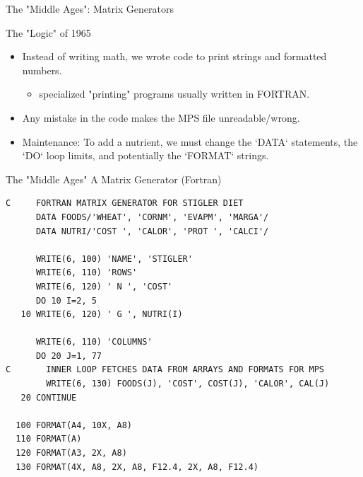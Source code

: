 \documentclass[presentation, aspectratio=169]{beamer}
\begin{document}
\begin{frame}[label={sec:orgff246a0}]{The "Middle Ages": Matrix Generators}
\begin{block}{The "Logic" of 1965}
\begin{itemize}
\item Instead of writing math, we wrote code to print strings and formatted numbers.
\begin{itemize}
\item specialized "printing" programs usually written in FORTRAN.
\end{itemize}
\item Any mistake in the code makes the MPS file unreadable/wrong.
\item \alert{\alert{Maintenance}}: To add a nutrient, we must change the `DATA` statements, the `DO` loop limits, and potentially the `FORMAT` strings.
\end{itemize}
\end{block}
\end{frame}


\begin{frame}[label={sec:org6368686},fragile]{The "Middle Ages"}
 A Matrix Generator (Fortran)

{\scriptsize
\begin{verbatim}
C     FORTRAN MATRIX GENERATOR FOR STIGLER DIET
      DATA FOODS/'WHEAT', 'CORNM', 'EVAPM', 'MARGA'/
      DATA NUTRI/'COST ', 'CALOR', 'PROT ', 'CALCI'/
      
      WRITE(6, 100) 'NAME', 'STIGLER'
      WRITE(6, 110) 'ROWS'
      WRITE(6, 120) ' N ', 'COST'
      DO 10 I=2, 5
   10 WRITE(6, 120) ' G ', NUTRI(I)
   
      WRITE(6, 110) 'COLUMNS'
      DO 20 J=1, 77
C       INNER LOOP FETCHES DATA FROM ARRAYS AND FORMATS FOR MPS
        WRITE(6, 130) FOODS(J), 'COST', COST(J), 'CALOR', CAL(J)
   20 CONTINUE
   
  100 FORMAT(A4, 10X, A8)
  110 FORMAT(A)
  120 FORMAT(A3, 2X, A8)
  130 FORMAT(4X, A8, 2X, A8, F12.4, 2X, A8, F12.4)
\end{verbatim}
}
\end{frame}
\end{document}
